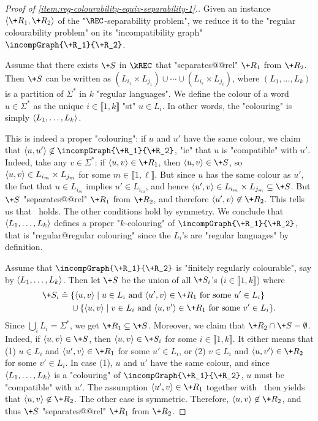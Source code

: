 \begin{proof}[Proof of \eqref{item:reg-colourability-equiv-separability-1}.]
    \AP Given an instance $\tup{\+R_1,\+R_2}$ of the "$\REC$-separability problem", we
    reduce it to the "regular colourability problem" on its "incompatibility graph"
    $\incompGraph{\+R_1}{\+R_2}$.

    Assume that there exists $\+S$ in $\kREC$ that "separates@@rel" $\+R_1$ from $\+R_2$.
    Then $\+S$ can be written as $(L_{i_1}\times L_{j_1}) \cup \cdots \cup (L_{i_\ell}\times L_{j_\ell})$, 
    where $(L_1,\hdots,L_k)$ is a partition of $\Sigma^*$ in $k$ "regular languages".
    We define the colour of a word $u \in \Sigma^*$ as the unique $i \in \lBrack 1,k \rBrack$
    "st" $u \in L_i$. In other words, the "colouring" is simply $\langle L_1,\hdots,L_k\rangle$. 

    This is indeed a proper "colouring": if $u$ and $u'$ have the same colour,
    we claim that $\tup{u,u'} \not\in \incompGraph{\+R_1}{\+R_2}$, "ie" that
    $u$ is "compatible" with $u'$. Indeed, take any $v \in \Sigma^*$: if $\tup{u,v} \in \+R_1$,
    then $\tup{u,v} \in \+S$, so $\langle u,v\rangle \in L_{i_m}\times L_{j_m}$ for some $m \in \lBrack 1,\ell\rBrack$. But since $u$ has the same colour 
    as $u'$, the fact that $u \in L_{i_m}$ implies $u' \in L_{i_m}$, and hence 
    $\tup{u',v} \in L_{i_m}\times L_{j_m}\subseteq \+S$.
    But $\+S$ "separates@@rel" $\+R_1$ from $\+R_2$, and therefore $\tup{u',v} \not\in \+R_2$.
    This tells us that \compL\ holds. The other conditions hold by symmetry.
    We conclude that $\langle L_1,\hdots,L_k\rangle$ defines
    a proper "$k$-colouring" of $\incompGraph{\+R_1}{\+R_2}$, that is "regular@regular colouring" since the $L_i$'s are "regular languages" by definition.

    Assume that $\incompGraph{\+R_1}{\+R_2}$ is "finitely regularly colourable", say by
    $\langle L_1,\hdots,L_k\rangle$. Then let $\+S$ be the union of all $\+S_i$'s ($i \in \lBrack 1,k\rBrack$) where
    \begin{align*}
        \+S_i \defeq\; & \{\tup{u,v} \mid u \in L_i \text{ and } \tup{u',v} \in \+R_1 \text{ for some } u' \in L_i \}\\
        & \cup \{\tup{u,v} \mid v \in L_i \text{ and } \tup{u,v'} \in \+R_1 \text{ for some } v' \in L_i \}.  
    \end{align*}
    Since $\bigcup_i L_i = \Sigma^*$, we get $\+R_1 \subseteq \+S$.
    Moreover, we claim that $\+R_2 \cap \+S = \emptyset$. Indeed, if $\tup{u,v} \in \+S$,
    then $\tup{u,v} \in \+S_i$ for some $i \in \lBrack 1,k\rBrack$. It either means that
    (1) $u\in L_i$ and $\tup{u',v} \in \+R_1$ for some $u' \in L_i$, or
    (2) $v\in L_i$ and $\tup{u,v'} \in \+R_2$
    for some $v' \in L_i$. In case (1), $u$ and $u'$
    have the same colour, and since $\langle L_1,\hdots,L_k\rangle$ is a "colouring"
    of $\incompGraph{\+R_1}{\+R_2}$, $u$ must be "compatible" with $u'$.
    The assumption $\tup{u',v} \in \+R_1$ together with \compLpr\ then yields
    that $\tup{u,v} \not\in \+R_2$. The other case is symmetric.
    Therefore, $\tup{u,v} \not\in \+R_2$, and thus $\+S$ "separates@@rel" $\+R_1$ from $\+R_2$.


\end{proof}
